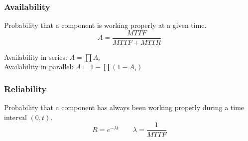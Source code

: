 \subsubsection{Availability}
Probability that a component is working properly at a given time.
\[ A = \frac{MTTF}{MTTF + MTTR} \]

Availability in series: $A = \prod A_i$\\
Availability in parallel: $A = 1 - \prod (1 - A_i)$

\subsubsection{Reliability}
Probability that a component has always been working properly during a time interval $(0, t)$.
\[ R = e^{-\lambda t} \qquad \lambda =\frac{1}{MTTF} \]